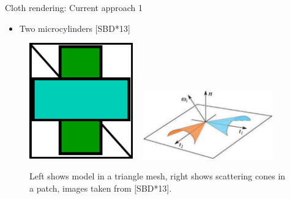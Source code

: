 \documentclass{beamer}
\begin{document}
\begin{frame}{Cloth rendering: Current approach 1}
\begin{itemize}
\setlength\itemsep{0.5em}
\item Two microcylinders [SBD*13]
\end{itemize}
\begin{center}
\begin{figure}
\includegraphics[width=0.4\textwidth]{img/cloth_model}
~
\includegraphics[width=0.5\textwidth]{img/microcylinders}
\caption*{\tiny{Left shows model in a triangle mesh, right shows scattering cones in a patch, images taken from [SBD*13].}}
\end{figure}
\end{center}
\end{frame}
\end{document}

